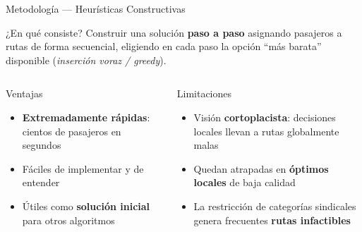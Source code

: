 \documentclass[10pt, aspectratio=169]{beamer}
\begin{document}
\begin{frame}{Metodología — Heurísticas Constructivas}

  \begin{block}{¿En qué consiste?}
    Construir una solución \textbf{paso a paso} asignando pasajeros a rutas de forma secuencial, eligiendo en cada paso la opción ``más barata'' disponible (\textit{inserción voraz / greedy}).
  \end{block}

  \vspace{8pt}
  \begin{columns}[T]
      \begin{exampleblock}{\textcolor{verdeok}{Ventajas}}
        \begin{itemize}\setlength\itemsep{5pt}
          \item \textbf{Extremadamente rápidas}: cientos de pasajeros en segundos
          \item Fáciles de implementar y de entender
          \item Útiles como \textbf{solución inicial} para otros algoritmos
        \end{itemize}
      \end{exampleblock}

      \begin{alertblock}{\textcolor{rojono}{Limitaciones}}
        \begin{itemize}\setlength\itemsep{5pt}
          \item Visión \textbf{cortoplacista}: decisiones locales llevan a rutas globalmente malas
          \item Quedan atrapadas en \textbf{óptimos locales} de baja calidad
          \item La restricción de categorías sindicales genera frecuentes \textbf{rutas infactibles}
        \end{itemize}
      \end{alertblock}
  \end{columns}

\end{frame}
\end{document}
